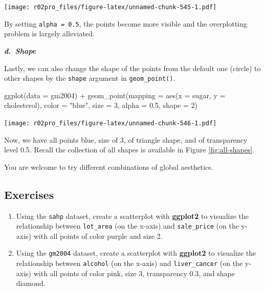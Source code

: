 \documentclass[
]{book}
\newenvironment{Shaded}{\begin{snugshade}}{\end{snugshade}}
\newcommand{\AttributeTok}[1]{\textcolor[rgb]{0.77,0.63,0.00}{#1}}
\newcommand{\DecValTok}[1]{\textcolor[rgb]{0.00,0.00,0.81}{#1}}
\newcommand{\FloatTok}[1]{\textcolor[rgb]{0.00,0.00,0.81}{#1}}
\newcommand{\FunctionTok}[1]{\textcolor[rgb]{0.00,0.00,0.00}{#1}}
\newcommand{\NormalTok}[1]{#1}
\newcommand{\SpecialCharTok}[1]{\textcolor[rgb]{0.00,0.00,0.00}{#1}}
\newcommand{\StringTok}[1]{\textcolor[rgb]{0.31,0.60,0.02}{#1}}
\begin{document}
\texttt{[image: r02pro\_files/figure-latex/unnamed-chunk-545-1.pdf]}

By setting \texttt{alpha\ =\ 0.5}, the points become more visible and the overplotting problem is largely alleviated.

\textbf{\emph{d.~Shape}}

Lastly, we can also change the shape of the points from the default one (circle) to other shapes by the \texttt{shape} argument in \texttt{geom\_point()}.

\begin{Shaded}
\begin{Highlighting}[]
\FunctionTok{ggplot}\NormalTok{(}\AttributeTok{data =}\NormalTok{ gm2004) }\SpecialCharTok{+} 
  \FunctionTok{geom\_point}\NormalTok{(}\AttributeTok{mapping =} \FunctionTok{aes}\NormalTok{(}\AttributeTok{x =}\NormalTok{ sugar, }\AttributeTok{y =}\NormalTok{ cholesterol),}
             \AttributeTok{color =} \StringTok{"blue"}\NormalTok{,}
             \AttributeTok{size =} \DecValTok{3}\NormalTok{, }
             \AttributeTok{alpha =} \FloatTok{0.5}\NormalTok{,}
             \AttributeTok{shape =} \DecValTok{2}\NormalTok{)}
\end{Highlighting}
\end{Shaded}

\texttt{[image: r02pro\_files/figure-latex/unnamed-chunk-546-1.pdf]}

Now, we have all points blue, size of 3, of triangle shape, and of transparency level 0.5. Recall the collection of all shapes is available in Figure \ref{fig:all-shapes}.

You are welcome to try different combinations of global aesthetics.

\hypertarget{exercises-32}{%
\subsection{Exercises}\label{exercises-32}}

\begin{enumerate}
\def\labelenumi{\arabic{enumi}.}
\item
  Using the \texttt{sahp} dataset, create a scatterplot with \textbf{ggplot2} to visualize the relationship between \texttt{lot\_area} (on the x-axis) and \texttt{sale\_price} (on the y-axis) with all points of color purple and size 2.
\item
  Using the \texttt{gm2004} dataset, create a scatterplot with \textbf{ggplot2} to visualize the relationship between \texttt{alcohol} (on the x-axis) and \texttt{liver\_cancer} (on the y-axis) with all points of color pink, size 3, transparency 0.3, and shape diamond.
\end{enumerate}
\end{document}
